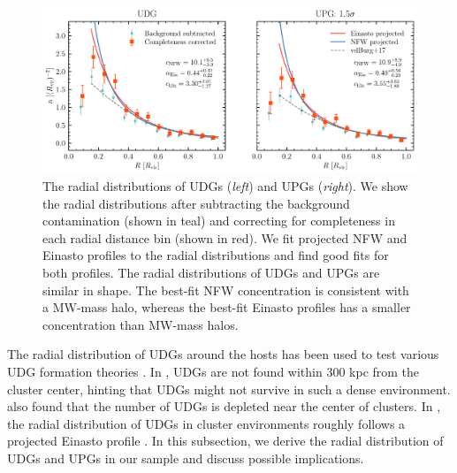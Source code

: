 \documentclass[twocolumn,astrosymb,twocolappendix]{aastex631}
\begin{document}
\begin{CJK*}{UTF8}{gbsn}
\begin{figure}
	\vbox{ 
		\centering
		\includegraphics[width=1\linewidth]{radial_distribution.pdf}
	}
    \caption{The radial distributions of UDGs (\textit{left}) and UPGs (\textit{right}). We show the radial distributions after subtracting the background contamination (shown in teal) and correcting for completeness in each radial distance bin (shown in red). We fit projected NFW and Einasto profiles to the radial distributions and find good fits for both profiles. The radial distributions of UDGs and UPGs are similar in shape. The best-fit NFW concentration is consistent with a MW-mass halo, whereas the best-fit Einasto profiles has a smaller concentration than MW-mass halos.}
    \label{fig:radial_distribution}
\end{figure}


The radial distribution of UDGs around the hosts has been used to test various UDG formation theories \citep[e.g.,][]{Tremmel2020}. In \citet{vanDokkum2015}, UDGs are not found within 300 kpc from the cluster center, hinting that UDGs might not survive in such a dense environment. \citet{vdBurg2016,ManceraPina2018} also found that the number of UDGs is depleted near the center of clusters. In \citet{vdBurg2016}, the radial distribution of UDGs in cluster environments roughly follows a projected Einasto profile \citep{Einasto1965}. In this subsection, we derive the radial distribution of UDGs and UPGs in our sample and discuss possible implications.


\end{CJK*}
\end{document}
